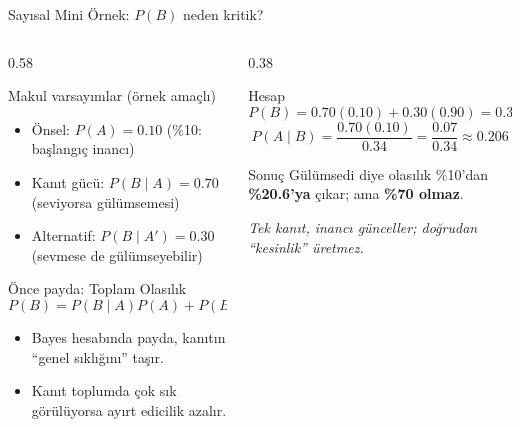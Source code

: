 \documentclass[light]{lutbeamer}
\begin{document}
\begin{frame}{Sayısal Mini Örnek: \texorpdfstring{$P(B)$}{P(B)} neden kritik?}
    \small
    \begin{columns}[T]
        \begin{column}{0.58\textwidth}
            \begin{block}{Makul varsayımlar (örnek amaçlı)}
                \begin{itemize}
                    \item Önsel: $P(A)=0.10$ \hfill (\%10: başlangıç inancı)
                    \item Kanıt gücü: $P(B\mid A)=0.70$ \hfill (seviyorsa gülümsemesi)
                    \item Alternatif: $P(B\mid A')=0.30$ \hfill (sevmese de gülümseyebilir)
                \end{itemize}
            \end{block}

            \begin{block}{Önce payda: Toplam Olasılık}
                \[
                P(B)=P(B\mid A)P(A)+P(B\mid A')P(A').
                \]
            \end{block}

            \begin{itemize}
                \item Bayes hesabında payda, kanıtın ``genel sıklığını'' taşır.
                \item Kanıt toplumda çok sık görülüyorsa ayırt edicilik azalır.
            \end{itemize}
        \end{column}

        \begin{column}{0.38\textwidth}
            \begin{block}{Hesap}
                \footnotesize
                \[
                P(B)=0.70(0.10)+0.30(0.90)=0.34
                \]
                \[
                P(A\mid B)=\frac{0.70(0.10)}{0.34}=\frac{0.07}{0.34}\approx 0.206
                \]
            \end{block}

            \begin{alertblock}{Sonuç}
                Gülümsedi diye olasılık \%10'dan \textbf{\%20.6'ya} çıkar;
                ama \textbf{\%70 olmaz}.
            \end{alertblock}

            \tiny
            \textit{Tek kanıt, inancı günceller; doğrudan ``kesinlik'' üretmez.}
        \end{column}
    \end{columns}
\end{frame}
\end{document}
